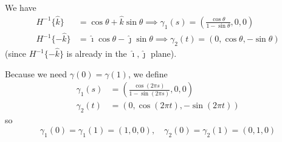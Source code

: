 \documentclass[12pt]{article}
\newcommand{\ihat}{\hat{\imath}}
\newcommand{\jhat}{\hat{\jmath}}
\newcommand{\khat}{\hat{k}}
\begin{document}
        We have 
        \begin{align*}
            H^{-1}\{\khat\} &= \cos \theta + \khat \sin \theta \implies \gamma_1(s) = \left(\frac{\cos \theta}{1 - \sin \theta}, 0, 0\right)\\ 
            H^{-1}\{-\khat\} &= \ihat \cos \theta - \jhat \sin \theta \implies \gamma_2(t) = \left(0, \cos \theta, -\sin \theta\right)
        \end{align*}
        (since $H^{-1}\{-\khat\}$ is already in the $\ihat, \jhat$ plane).

        Because we need $\gamma(0) = \gamma(1)$, we define 
        \begin{align*}
            \gamma_1(s) &= \left(\frac{\cos(2 \pi s)}{1 - \sin(2\pi s) }, 0, 0\right)\\
            \gamma_2(t) &= \left(0, \cos (2\pi t), -\sin(2\pi t)\right)
        \end{align*}
        so 
        \[\gamma_1(0) = \gamma_1(1) = (1, 0, 0), \quad \gamma_2(0) = \gamma_2(1) = (0, 1, 0)\]
        
\end{document}
